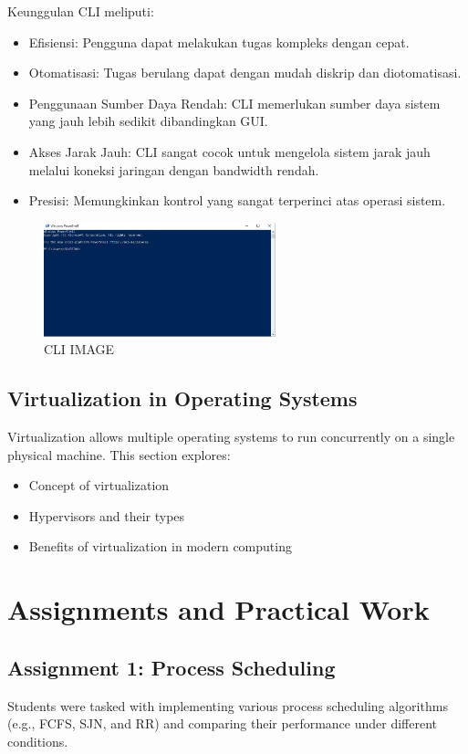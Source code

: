 \documentclass[12pt]{article}
\begin{document}
		Keunggulan CLI meliputi:
		\begin{itemize}
			\item Efisiensi: Pengguna dapat melakukan tugas kompleks dengan cepat.
			\item Otomatisasi: Tugas berulang dapat dengan mudah diskrip dan diotomatisasi.
			\item Penggunaan Sumber Daya Rendah: CLI memerlukan sumber daya sistem yang jauh lebih sedikit dibandingkan GUI.
			\item Akses Jarak Jauh: CLI sangat cocok untuk mengelola sistem jarak jauh melalui koneksi jaringan dengan bandwidth rendah.
			\item Presisi: Memungkinkan kontrol yang sangat terperinci atas operasi sistem. \cite{Greenberg2017}
		\end{itemize}

            \begin{figure}[h]
                \centering
                \includegraphics[width=0.6\textwidth]{asset/CLI.JPG}
                \caption{CLI IMAGE}
            \end{figure}

\subsection{Virtualization in Operating Systems}
Virtualization allows multiple operating systems to run concurrently on a single physical machine. This section explores:
\begin{itemize}
    \item Concept of virtualization
    \item Hypervisors and their types
    \item Benefits of virtualization in modern computing
\end{itemize}

\section{Assignments and Practical Work}
\subsection{Assignment 1: Process Scheduling}
Students were tasked with implementing various process scheduling algorithms (e.g., FCFS, SJN, and RR) and comparing their performance under different conditions.
\end{document}
